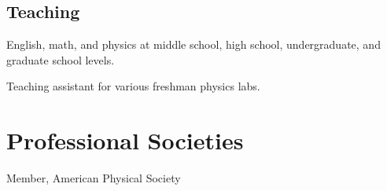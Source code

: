 \documentclass[letterpaper]{article}
\def\footerlink{\null}
\renewenvironment{itemize}{
\begin{list}{}{
\setlength{\leftmargin}{1.5em}
}
}{
\end{list}
}
\begin{document}
\subsection*{Teaching}
\begin{itemize}
\item English, math, and physics at middle school, high school, undergraduate, and graduate school levels.
\item Teaching assistant for various freshman physics labs.
\end{itemize}
\section*{Professional Societies}
\begin{itemize}
\item Member, American Physical Society
\end{itemize}

\end{document}
